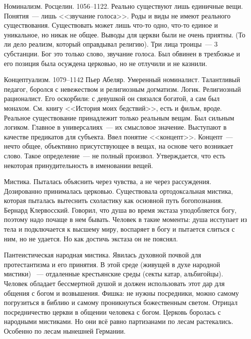 Номинализм.
Росцелин. 1056--1122. Реально существуют лишь единичные вещи. Понятия~--- лишь <<звучание голоса>>. Роды и виды не имеют реального существования. Существовать может лишь что-то одно, что-то единое и уникальное, но никак не общее. Выводы для церкви были не очень приятны. (То ли дело реализм, который оправдывал религию). Три лица троицы~--- 3 субстанции. Бог это только слово, звучание голоса. Был обвинен в трехбожье и его позиция была осуждена церковью, но не отлучили и не казнили.

Концептуализм. 1079--1142 Пьер Абеляр. Умеренный номиналист. Талантливый педагог, боролся с невежеством и религиозным догматизм. Логик. Религиозный рационалист. Его оскорбили: с девушкой он связался богатой, а сам был монахом. См. книгу <<История моих бедствий>>, есть и фильм, вроде. Реальное существование принадлежит только реальным вещам. Был сильным логиком. Главное в универсалиях~--- их смысловое значение. Выступают в качестве предикатов для субъекта. Ввел понятие <<концепт>>. Концепт~--- нечто общее, объективно присутствующее в вещах, на основе чего возникает слово. Такое определение~--- не полный произвол. Утверждается, что есть некоторая принудительность в именовании вещей.

Мистика. Пыталась объяснить через чувства, а не через рассуждения. Дозированно принималась церковью. Существовала ортодоксальная мистика, которая пыталась вытеснить схоластику как основной путь богопознания. Бернард Клервосский. Говорил, что душа во время экстаза уподобляется богу, поэтому надо почаще в нем бывать. Человек в такие моменты: душа исступает из тела и подключается к высшему миру, воспаряет в богу и пытается слиться с ним, но не удается. Но как достичь экстаза он не пояснял.

Пантеистическая народная мистика. Явилась духовной почвой для протестантизма и его принятия. В этой среде (живущей в духе народной мистики) ~--- отдаленные крестьянские среды (секты катар, альбигойцы). Человек обладает бессмертной душой и должен использовать этот дар для общения с богом и возвышения. Фишка: не нужны посредники, можно самому погрузиться в библию и самому проникнуться божественным светом. Отрицал посредничество церкви в общении человека с богом. Церковь боролась с народными мистиками. Но они всё равно партизанами по лесам растекались. Особенно по лесам нынешней Германии.

